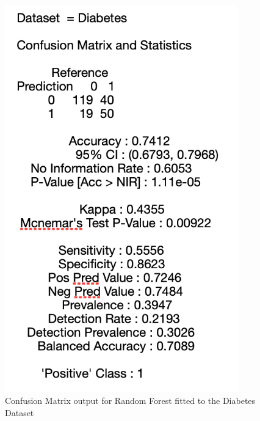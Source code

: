 \begin{figure}[!htbp]
\begin{minipage}{0.45\textwidth}
        \includegraphics[width=0.9\textwidth]{ThesisTemplate/appendix/images/Chapter5Appendix/ConfusionMatrix/Diabetes.png} 
        \caption{Confusion Matrix output for Random Forest fitted to the Diabetes Dataset}
        \label{fig:my_label}
    \end{minipage}
\end{figure}

